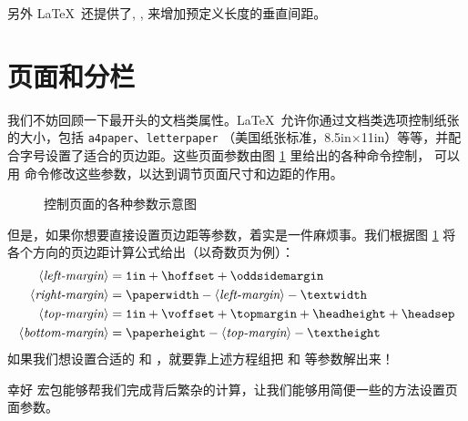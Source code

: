 另外 \LaTeX\ 还提供了, ,  来增加预定义长度的垂直间距。

\section{页面和分栏}

我们不妨回顾一下最开头的文档类属性。\LaTeX\ 允许你通过文档类选项控制纸张的大小，包括 \texttt{a4paper}、\texttt{letterpaper}
（美国纸张标准，8.5in$\times$11in）等等，并配合字号设置了适合的页边距。这些页面参数由图 \ref{fig:layouts} 里给出的各种命令控制，
可以用  命令修改这些参数，以达到调节页面尺寸和边距的作用。

\begin{figure}[!p]
\currentpage
\oddpagelayouttrue
\pagediagram
\caption{控制页面的各种参数示意图} \label{fig:layouts}
\end{figure}

但是，如果你想要直接设置页边距等参数，着实是一件麻烦事。我们根据图 \ref{fig:layouts} 将各个方向的页边距计算公式给出（以奇数页为例）：
\begin{align*}
\langle\text{\itshape left-margin}\rangle   &= \text{\ttfamily 1in} 
                                             + \text{\cmd{hoffset}}
                                             + \text{\cmd{oddsidemargin}} \\
\langle\text{\itshape right-margin}\rangle  &= \text{\cmd{paperwidth}} 
                                             - \langle\text{\itshape left-margin}\rangle
                                             - \text{\cmd{textwidth}} \\
\langle\text{\itshape top-margin}\rangle    &= \text{\ttfamily 1in} 
                                             + \text{\cmd{voffset}}
                                             + \text{\cmd{topmargin}}
                                             + \text{\cmd{headheight}}
                                             + \text{\cmd{headsep}} \\
\langle\text{\itshape bottom-margin}\rangle &= \text{\cmd{paperheight}}
                                             - \langle\text{\itshape top-margin}\rangle
                                             - \text{\cmd{textheight}}
\end{align*}
如果我们想设置合适的  和 ，就要靠上述方程组把  和  等参数解出来！

幸好  宏包能够帮我们完成背后繁杂的计算，让我们能够用简便一些的方法设置页面参数。

